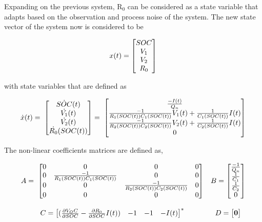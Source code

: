 \documentclass[12pt]{article}
\begin{document}
\par
Expanding on the previous system, R$_0$ can be considered as a state variable that adapts based on the observation and process noise of the system. The new state vector of the system now is considered to be 

\begin{equation}
\centering x(t) =
\begin{bmatrix}
SOC \\ V_1 \\ V_2 \\ R_0
\end{bmatrix}
\end{equation}

with state variables that are defined as 

\begin{equation}
\centering
\dot{x}(t) = \;
\begin{bmatrix}
\dot{SOC} (t) \\
\dot{V_1} (t) \\
\dot{V_2} (t) \\
\dot{R_0} (SOC(t)) \\
\end{bmatrix} 
= \;
\begin{bmatrix}
\frac{-I(t)}{Q_n} \\
\frac{-1}{R_1(SOC(t))C_1(SOC(t))}V_1(t) + \frac{1}{C_1(SOC(t))}I(t) \\
\frac{-1}{R_2(SOC(t))C_2(SOC(t))}V_2(t) + \frac{1}{C_2(SOC(t))}I(t) \\
0
\end{bmatrix}
\end{equation}

The non-linear coefficients matrices are defined as, 

\begin{equation}
\centering
\begin{matrix}
A = \;
\begin{bmatrix}
0 & 0 & 0 & 0 \\
0 & \frac{-1}{R_1(SOC(t))C_1(SOC(t))} & 0 & 0 \\
0 & 0 & \frac{-1}{R_2(SOC(t))C_2(SOC(t))} & 0 \\
0 & 0 & 0 & 0 \\
\end{bmatrix} 
&
B = 
\begin{bmatrix}
\frac{-1}{Q_n} \\
\frac{1}{C_1} \\
\frac{1}{C_2} \\
0
\end{bmatrix} 

\\ \\

C =
\begin{bmatrix}
(\frac{\partial{V_OC}}{\partial{SOC}} - \frac{\partial{R_0}}{\partial{SOC}}I(t)) & -1 & -1 & -I(t) 
\end{bmatrix}^* &

D = 
\begin{bmatrix}
\bf{0}
\end{bmatrix}

\end{matrix}
\end{equation}
\end{document}
